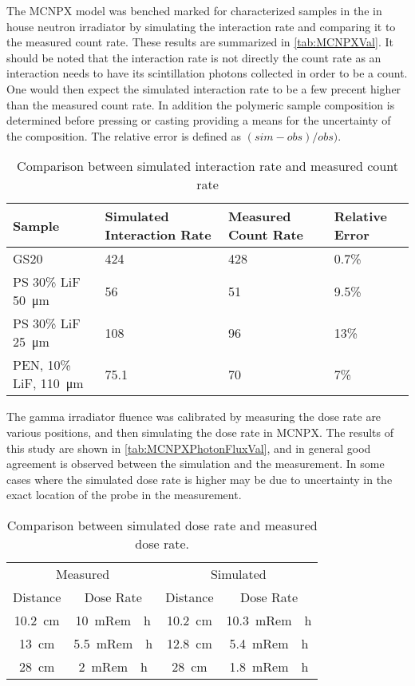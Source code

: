 The MCNPX model was benched marked for characterized samples in the in house  neutron irradiator by simulating the interaction rate and comparing it to the measured count rate.
These results are summarized in \autoref{tab:MCNPXVal}.
It should be noted that the interaction rate is not directly the count rate as an interaction needs to have its scintillation photons collected in order to be a count. 
One would then expect the simulated interaction rate to be a few precent higher than the measured count rate.
In addition the polymeric sample composition is determined before pressing or casting providing a means for the uncertainty of the composition.
The relative error is defined as $(sim-obs)/obs)$.
\begin{table}
	\centering
	\caption[MCNPX Neutron Validation Results]{Comparison between simulated interaction rate and measured count rate}
	\label{tab:MCNPXVal}
	\begin{tabular}{m{3cm} | p{4cm} p{4cm} p{2cm}}
		\toprule
			Sample & Simulated Interaction Rate & Measured Count Rate & Relative Error \\
		\midrule
			GS20 & 424  & 428 & 0.7\%  \\ 
			PS 30\% LiF \SI{50}{\um} &  56 & 51 & 9.5\% \\
			PS 30\% LiF \SI{25}{\um} & 108 & 96 &13\%  \\
			PEN, 10\% LiF, \SI{110}{\um} & 75.1 & 70 & 7\% \\
		\bottomrule
	\end{tabular}
\end{table}

The gamma irradiator fluence was calibrated by measuring the dose rate are various positions, and then simulating the dose rate in MCNPX.
The results of this study are shown in \autoref{tab:MCNPXPhotonFluxVal}, and in general good agreement is observed between the simulation and the measurement.
In some cases where the simulated dose rate is higher may be due to uncertainty in the exact location of the probe in the measurement.
\begin{table}
	\centering
	\caption[MCNPX Photon Dose Rate Validation Results]{Comparison between simulated dose rate and measured dose rate.}
	\label{tab:MCNPXPhotonFluxVal}
	\begin{tabular}{c  c |c  c}
		\toprule
		\multicolumn{2}{c}{Measured} & \multicolumn{2}{c}{Simulated} \\
		Distance  & Dose Rate & Distance & Dose Rate \\
		\midrule
		\SI{10.2}{\cm} & \SI{10}{mRem \per h} & \SI{10.2}{\cm} & \SI{10.3}{mRem \per h} \\
		\SI{13}{\cm} & \SI{5.5}{mRem \per h} & \SI{12.8}{\cm} & \SI{5.4}{mRem \per h} \\
		\SI{28}{\cm} & \SI{2}{mRem \per h} & \SI{28}{\cm} & \SI{1.8}{mRem \per h} \\
		\bottomrule
	\end{tabular}
\end{table}
